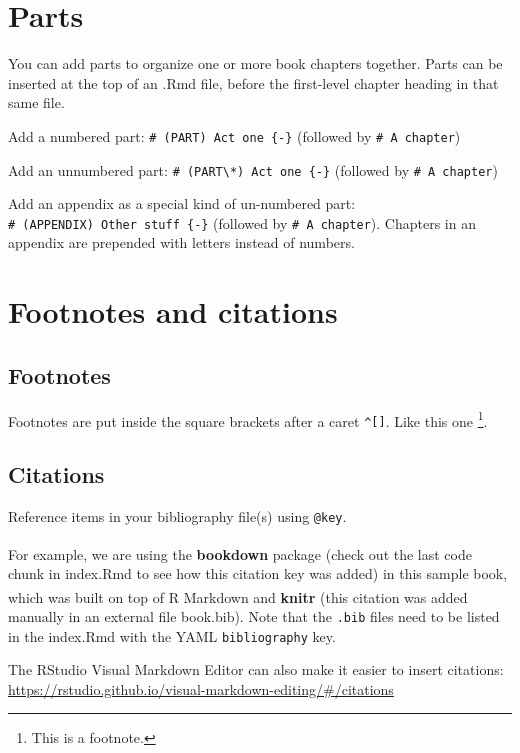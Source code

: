 \documentclass[
]{book}
\theoremstyle{definition}
\theoremstyle{definition}
\theoremstyle{definition}
\theoremstyle{definition}
\theoremstyle{remark}
\begin{document}
\section{Parts}\label{parts}

You can add parts to organize one or more book chapters together. Parts can be inserted at the top of an .Rmd file, before the first-level chapter heading in that same file.

Add a numbered part: \texttt{\#\ (PART)\ Act\ one\ \{-\}} (followed by \texttt{\#\ A\ chapter})

Add an unnumbered part: \texttt{\#\ (PART\textbackslash{}*)\ Act\ one\ \{-\}} (followed by \texttt{\#\ A\ chapter})

Add an appendix as a special kind of un-numbered part: \texttt{\#\ (APPENDIX)\ Other\ stuff\ \{-\}} (followed by \texttt{\#\ A\ chapter}). Chapters in an appendix are prepended with letters instead of numbers.

\section{Footnotes and citations}\label{footnotes-and-citations}

\subsection{Footnotes}\label{footnotes}

Footnotes are put inside the square brackets after a caret \texttt{\^{}{[}{]}}. Like this one \footnote{This is a footnote.}.

\subsection{Citations}\label{citations}

Reference items in your bibliography file(s) using \texttt{@key}.

For example, we are using the \textbf{bookdown} package\textsuperscript{} (check out the last code chunk in index.Rmd to see how this citation key was added) in this sample book, which was built on top of R Markdown and \textbf{knitr}\textsuperscript{} (this citation was added manually in an external file book.bib).
Note that the \texttt{.bib} files need to be listed in the index.Rmd with the YAML \texttt{bibliography} key.

The RStudio Visual Markdown Editor can also make it easier to insert citations: \url{https://rstudio.github.io/visual-markdown-editing/\#/citations}
\end{document}

